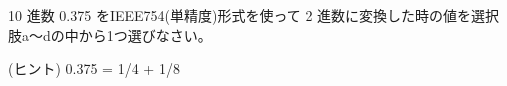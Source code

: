 10 進数 0.375 をIEEE754(単精度)形式を使って 2 進数に変換した時の値を選択肢a〜dの中から1つ選びなさい。

\medskip
\noindent (ヒント) 0.375 = 1/4 + 1/8
